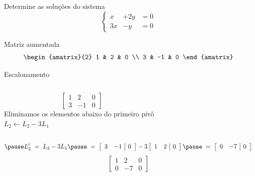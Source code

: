 \begin{question}
  Determine as soluções do sistema
  \[
    \left\{\begin{array}{rrrr}
      x  & + 2y & = 0 \\
      3x & -  y & = 0
    \end{array}\right.
  \]

  \bigskip
  \pause
  Matriz aumentada
  \[
    \begin{amatrix}{2}
      1 & 2  & 0 \\
      3 & -1 & 0
    \end{amatrix}
  \]
\end{question}

\begin{resolution}{Escalonamento}
  \begin{columns}
    \[\;\;\;
    \left[\begin{array}{cc|c}
      1 & 2  & 0 \\
      3 & -1 & 0
    \end{array}\right]
    \]
    \pause
    Eliminamos os elementos abaixo do primeiro pivô
    \\ \pause
    \(
      L_2 \leftarrow L_2 - 3 L_1
    \)
  \end{columns}
  \vspace{-\baselineskip}
  \[
    \pause
    L'_2
    \;=\;
    L_2 - 3 L_1
    \pause
    \;=\;
    \left[\begin{array}{cc|c}
      3 & -1 & 0
    \end{array}\right]
    - 3
    \left[\begin{array}{cc|c}
      1 & 2  & 0
    \end{array}\right]
    \pause
    \;=\;
    \left[\begin{array}{cc|c}
      0 & -7 & 0
    \end{array}\right]
  \]
  \pause
  \[
    \left[\begin{array}{cc|c}
      1 & 2  & 0 \\
      0 & -7 & 0
    \end{array}\right]
  \]
\end{resolution}

